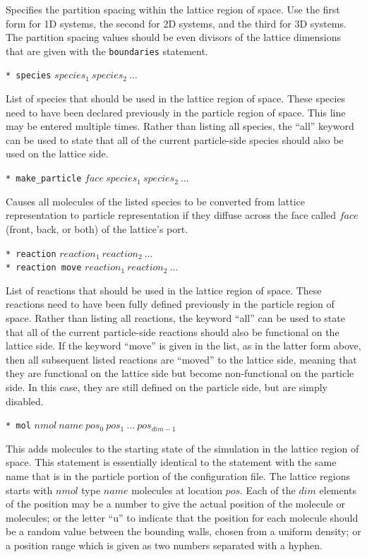 \documentclass {scrbook}
\newcommand {\ttt} {\texttt}
\begin{document}
\begin{description}
Specifies the partition spacing within the lattice region of space. Use the first form for 1D systems, the second for 2D systems, and the third for 3D systems. The partition spacing values should be even divisors of the lattice dimensions that are given with the \ttt{boundaries} statement.

\item{\ttt{* species} $species_1\ species_2\ ...$}

List of species that should be used in the lattice region of space. These species need to have been declared previously in the particle region of space. This line may be entered multiple times. Rather than listing all species, the ``all'' keyword can be used to state that all of the current particle-side species should also be used on the lattice side.

\item{\ttt{* make\_particle} $face\ species_1\ species_2\ ...$}

Causes all molecules of the listed species to be converted from lattice representation to particle representation if they diffuse across the face called $face$ (front, back, or both) of the lattice's port.

\item{\ttt{* reaction} $reaction_1\ reaction_2\ ...$\\
\ttt{* reaction move} $reaction_1\ reaction_2\ ...$}

List of reactions that should be used in the lattice region of space. These reactions need to have been fully defined previously in the particle region of space. Rather than listing all reactions, the keyword ``all'' can be used to state that all of the current particle-side reactions should also be functional on the lattice side. If the keyword ``move'' is given in the list, as in the latter form above, then all subsequent listed reactions are ``moved'' to the lattice side, meaning that they are functional on the lattice side but become non-functional on the particle side. In this case, they are still defined on the particle side, but are simply disabled.

\item{\ttt{* mol} $nmol\ name\ pos_0\ pos_1\ ...\ pos_{dim-1}$}

This adds molecules to the starting state of the simulation in the lattice region of space. This statement is essentially identical to the statement with the same name that is in the particle portion of the configuration file. The lattice regions starts with $nmol$ type $name$ molecules at location $pos$. Each of the $dim$ elements of the position may be a number to give the actual position of the molecule or molecules; or the letter ``u'' to indicate that the position for each molecule should be a random value between the bounding walls, chosen from a uniform density; or a position range which is given as two numbers separated with a hyphen.


\end{description}
\end{document}
